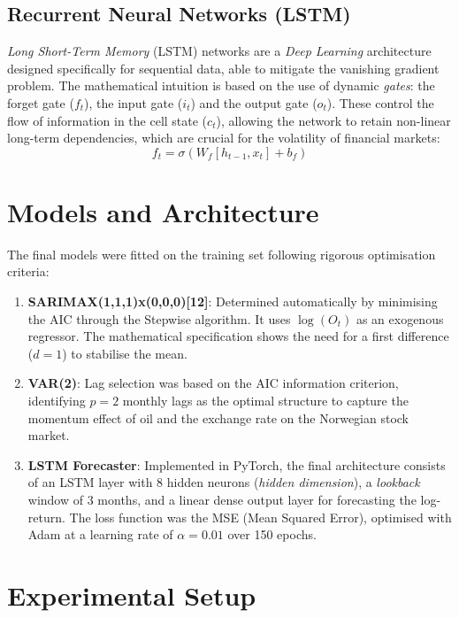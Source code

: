 \documentclass[11pt,a4paper]{article}
\begin{document}
\subsection{Recurrent Neural Networks (LSTM)}
\textit{Long Short-Term Memory} (LSTM) networks are a \textit{Deep Learning} architecture designed specifically for sequential data, able to mitigate the vanishing gradient problem. The mathematical intuition is based on the use of dynamic \textit{gates}: the forget gate ($f_t$), the input gate ($i_t$) and the output gate ($o_t$). These control the flow of information in the cell state ($c_t$), allowing the network to retain non-linear long-term dependencies, which are crucial for the volatility of financial markets:
\begin{equation}
f_t = \sigma(W_f [h_{t-1}, x_t] + b_f)
\end{equation}

\section{Models and Architecture}
The final models were fitted on the training set following rigorous optimisation criteria:

\begin{enumerate}
    \item \textbf{SARIMAX(1,1,1)x(0,0,0)[12]}: Determined automatically by minimising the AIC through the Stepwise algorithm. It uses $\log(O_t)$ as an exogenous regressor. The mathematical specification shows the need for a first difference ($d=1$) to stabilise the mean.
    \item \textbf{VAR(2)}: Lag selection was based on the AIC information criterion, identifying $p=2$ monthly lags as the optimal structure to capture the momentum effect of oil and the exchange rate on the Norwegian stock market.
    \item \textbf{LSTM Forecaster}: Implemented in PyTorch, the final architecture consists of an LSTM layer with $8$ hidden neurons (\textit{hidden dimension}), a \textit{lookback} window of 3 months, and a linear dense output layer for forecasting the log-return. The loss function was the MSE (Mean Squared Error), optimised with Adam at a learning rate of $\alpha = 0.01$ over 150 epochs.
\end{enumerate}

\section{Experimental Setup}
\end{document}
